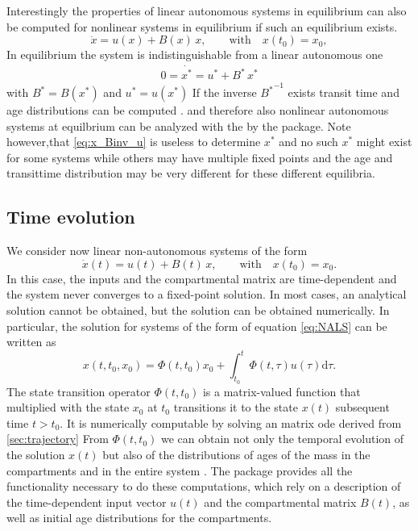 Interestingly the properties of linear autonomous systems in equilibrium can
also be computed for nonlinear systems in equilibrium if such an equilibrium
exists.
\begin{equation} \label{eq:NLS}
\dot{x} = u(x) + B(x) \, x, \qquad  \mathrm{with} \quad x(t_0) = x_0,
\end{equation}
In equilibrium the system is indistinguishable from a linear autonomous one
\begin{align} 
  0= \dot{x^*} = u^* + B^* \, x^*
\end{align}
with $B^*=B(x^*)$ and $u^*=u(x^*)$ 
If the inverse ${B^*}^{-1}$ exists transit time and age distributions can be computed 
\citep{Metzler2018MGS}.
and therefore also  nonlinear autonomous
systems at equilbrium can be analyzed with the by the
\LAPM package.
Note however,that 
\eqref{eq:x_Binv_u} is useless to determine $x^*$ and 
no such $x^*$ might exist for some systems
while others may have multiple fixed points and the age and
transittime distribution may be very different for these different equilibria.

\subsection{Time evolution} \label{sec:trajectory}
We consider now linear non-autonomous systems of the form
\begin{equation} \label{eq:NALS}
\dot{x}(t) = u(t) + B(t) \, x, \qquad  \mathrm{with} \quad x(t_0) = x_0.
\end{equation}
In this case, the inputs and the compartmental matrix are time-dependent and
the system never converges to a fixed-point solution. In most cases, an
analytical solution cannot be obtained, but the solution can be 
obtained numerically. In particular, the solution for systems of the form of equation \eqref{eq:NALS} can be written as
\begin{equation}
x(t, t_0, x_0) = \Phi(t, t_0) x_0 + \int_{t_0}^{t} \Phi(t, \tau) u(\tau) \mathrm{d}\tau.
\end{equation}
The state transition operator $\Phi(t,t_0)$ is a matrix-valued function that
multiplied with the state $x_0$ at $t_0$ transitions it to the state $x(t)$
subsequent time $t > t_0$. It is numerically computable by solving an matrix
ode derived from \eqref{sec:trajectory} 
From $\Phi(t,t_0)$ we can obtain not only the temporal evolution of the
solution $x(t)$ but also of the distributions of ages of the mass in the compartments and in the entire system \citep{Metzler2018PNAS}.
The \CompartmentalSystems package provides all the functionality necessary to do these computations, which rely on a description of the time-dependent input vector $u(t)$ and the compartmental matrix $B(t)$, as well as initial age distributions for the compartments.

